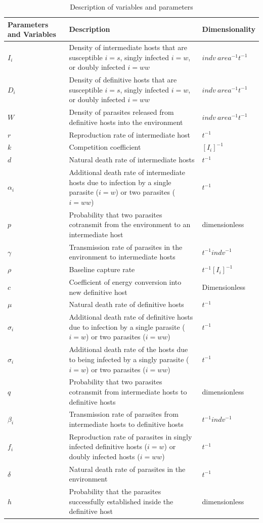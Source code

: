 \documentclass[a4paper]{scrartcl}
\begin{document}
\begin{table}[!ht]
\caption{Description of variables and parameters}
\label{table:varpardescription}
\centering
\begin{tabular}{p{2cm}|p{10cm}|p{3cm}}
\hline
Parameters and Variables    &  Description & Dimensionality \\
\hline
$I_i$  & Density of intermediate hosts that are susceptible $i=s$, singly infected $i=w$, or doubly infected $i=ww$ & $indv \ area^{-1}  t^{-1}$\\
\hline
$D_i$ & Density of definitive hosts that are susceptible $i=s$, singly infected $i=w$, or doubly infected $i=ww$ & $indv \ area^{-1}  t^{-1}$ \\
\hline
$W$ & Density of parasites released from definitive hosts into the environment & $indv \ area^{-1}  t^{-1}$\\
\hline
$r$ & Reproduction rate of intermediate host & $t^{-1}$ \\
\hline
$k$ & Competition coefficient & $[I_i]^{-1}$ \\
\hline
$d$ & Natural death rate of intermediate hosts & $t^{-1}$\\
\hline
$\alpha_i$ & Additional death rate of intermediate hosts due to infection by a single parasite ($i = w$) or two parasites ($i = ww$) & $t^{-1}$ \\
\hline
$p$ & Probability that two parasites cotransmit from the environment to an intermediate host  & dimensionless\\
\hline
$\gamma$ & Transmission rate of parasites in the environment to intermediate hosts &  $t^{-1}  indv^{-1}$ \\
\hline
$\rho$ & Baseline capture rate & $t^{-1} [I_i]^{-1}$ \\
\hline
$c$ & Coefficient of energy conversion into new definitive host & Dimensionless \\
\hline
$\mu$ & Natural death rate of definitive hosts & $t^{-1}$ \\
\hline
$\sigma_i$ & Additional death rate of definitive hosts due to infection by a single parasite ($i = w$) or two parasites ($i = ww$) & $t^{-1}$ \\
\hline
$\sigma_i$ & Additional death rate of the hosts due to being infected by a singly parasite ($i = w$) or two parasites ($i = ww$) & $t^{-1}$\\
\hline
$q$ & Probability that two parasites cotransmit from intermediate hosts to definitive hosts & dimensionless \\
\hline
$\beta_i$ & Transmission rate of parasites from intermediate hosts to definitive hosts & $t^{-1} indv^{-1}$\\
\hline
$f_i$ & Reproduction rate of parasites in singly infected definitive hosts ($i = w$) or doubly infected hosts ($i = ww$) &  $t^{-1}$ \\
\hline
$\delta$ & Natural death rate of parasites in the environment & $t^{-1}$ \\
\hline 
$h$ & Probability that the parasites successfully established inside the definitive host &  dimensionless \\
\end{tabular}
\end{table}
\end{document}
